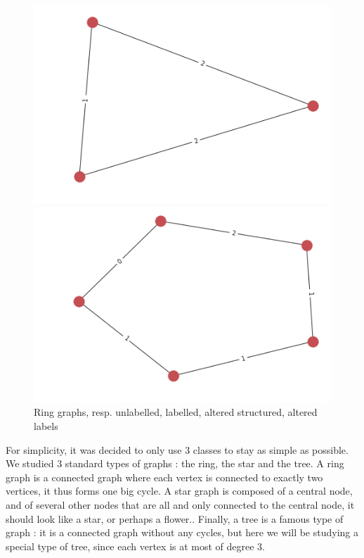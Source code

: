 \documentclass{article}
\theoremstyle{definition}
\begin{document}
\begin{figure}[!htb]
\begin{multicols}{4}
		\includegraphics[width=\linewidth]{data/generated-graphs/ring_altered_struct.png}\par
		\includegraphics[width=\linewidth]{data/generated-graphs/ring_altered_labels.png}\par
	\end{multicols}
	\caption{Ring graphs, resp. unlabelled, labelled, altered structured, altered labels}
\end{figure}
For simplicity, it was decided to only use 3 classes to stay as simple as possible. We studied 3 standard types of graphs : the ring, the star and the tree. A ring graph is a connected graph where each vertex is connected to exactly two vertices, it thus forms one big cycle. A star graph is composed of a central node, and of several other nodes that are all and only connected to the central node, it should look like a star, or perhaps a flower.. Finally, a tree is a famous type of graph : it is a connected graph without any cycles, but here we will be studying a special type of tree, since each vertex is at most of degree 3.\\
\end{document}

